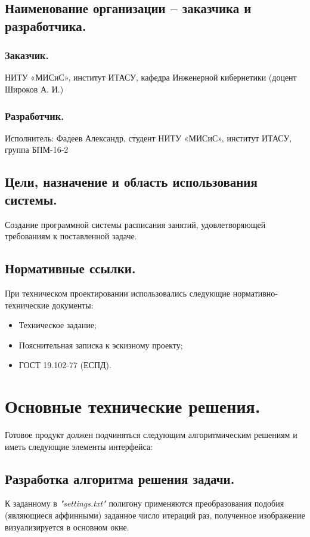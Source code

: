 \documentclass[a4paper,12pt,preview]{report} %
\begin{document}
	\subsection{Наименование организации -- заказчика и разработчика.}
	\subsubsection{Заказчик.}
	НИТУ «МИСиС», институт ИТАСУ, кафедра Инженерной кибернетики (доцент Широков А. И.)
	\subsubsection{Разработчик.}
	Исполнитель: Фадеев Александр, студент НИТУ «МИСиС», институт ИТАСУ, группа БПМ-16-2
	
	\subsection{Цели, назначение и область использования системы.}
	Создание программной системы расписания занятий, удовлетворяющей требованиям к поставленной задаче.
	
	\subsection{Нормативные ссылки.}
	При техническом проектировании использовались следующие нормативно-технические документы:
	
	\begin{itemize}
		\item Техническое задание;
		\item Пояснительная записка к эскизному проекту;
		\item ГОСТ 19.102-77 (ЕСПД).
	\end{itemize}
	
	
		\section{Основные технические решения.}
	
	Готовое продукт должен подчиняться следующим алгоритмическим решениям и иметь следующие элементы интерфейса:
	
	\subsection{Разработка алгоритма решения задачи.}
	
	К заданному в \textit{"settings.txt"} полигону применяются преобразования подобия (являющиеся аффинными) заданное число итераций раз, полученное изображение визуализируется в основном окне.
	
\end{document}

